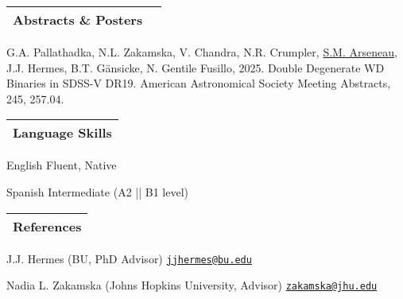 \documentclass[letterpaper,11pt]{article}
\newenvironment{packed_itemize}{
\begin{itemize}[label=\raisebox{0.25ex}{\tiny$\bullet$}]
  \setlength{\itemsep}{4.2pt}
  \setlength{\parskip}{0pt}
  \setlength{\parsep}{0pt}}{\end{itemize}
}
\newenvironment{packed_enumerate}[1][]{
\begin{etaremune}[#1]
  \setlength{\itemsep}{3.7pt}
  \setlength{\parskip}{0pt}
  \setlength{\parsep}{0pt}}{\end{etaremune}
}
\begin{document}
\noindent
\begin{tabular*}{\textwidth}{l@{\extracolsep{\fill}}r}
\large {\sc \Large{Abstracts \& Posters}}  \\
\hline
\end{tabular*}\vspace{3.5mm}

\noindent

\begin{packed_enumerate}

\item G.A. Pallathadka, N.L. Zakamska, V. Chandra, N.R. Crumpler, \underline{S.M. Arseneau}, J.J. Hermes, B.T. G\"ansicke, N. Gentile Fusillo, 2025. Double Degenerate WD Binaries in SDSS-V DR19. American Astronomical Society Meeting Abstracts, 245, 257.04.

\end{packed_enumerate}
\vspace{2.0mm}


\noindent
\begin{tabular*}{\textwidth}{l@{\extracolsep{\fill}}}
\large {\sc \Large{Language Skills}}\\
\hline
\end{tabular*}\vspace{1.mm}

\begin{packed_itemize}
    \item English \hfill Fluent, Native
    \item Spanish \hfill Intermediate (A2 || B1 level)
\end{packed_itemize}



\noindent
\begin{tabular*}{\textwidth}{l@{\extracolsep{\fill}}}
\large {\sc \Large{References}}\\
\hline
\end{tabular*}\vspace{1.mm}

\begin{packed_itemize}
    \item J.J. Hermes (BU, PhD Advisor) \hfill \href{mailto:jjhermes@bu.edu}{\texttt{jjhermes@bu.edu}}
    \item Nadia L. Zakamska (Johns Hopkins University, Advisor) \hfill \href{mailto:zakamska@jhu.edu}{\texttt{zakamska@jhu.edu}}
\end{packed_itemize}


\vspace*{\fill}
\end{document}
